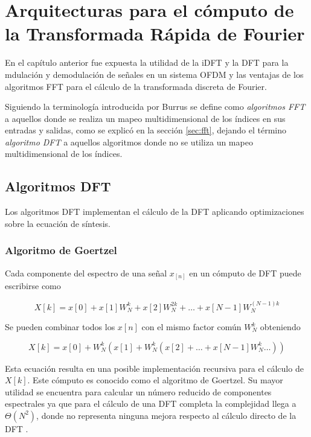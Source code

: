\chapter{Arquitecturas para el cómputo de la Transformada Rápida de Fourier} \label{sec:cap_arqs}

En el capítulo anterior fue expuesta la utilidad de la iDFT y la DFT para la mdulación y
demodulación de señales en un sistema OFDM y las ventajas de los algoritmos FFT para el cálculo de
la transformada discreta de Fourier.

Siguiendo la terminología introducida por Burrus \cite{Burrus} \cite{Meyer3_1} se define como
\textit{algoritmos FFT} a aquellos donde se realiza un mapeo multidimensional de los índices en sus
entradas y salidas, como se explicó en la sección \ref{sec:fft}, dejando el término \textit{algoritmo DFT}
a aquellos algoritmos donde no se utiliza un mapeo multidimensional de los índices.

\section{Algoritmos DFT}

Los algoritmos DFT implementan el cálculo de la DFT aplicando optimizaciones sobre la
ecuación de síntesis.

\subsection{Algoritmo de Goertzel}

Cada componente del espectro de una señal $x_{[n]}$ en un cómputo de DFT puede escribirse como

\begin{equation}
	X[k] = x[0] + x[1]W_{N}^{k} + x[2]W_{N}^{2k} + \ldots + x[N-1]W_{N}^{(N-1)k}  
\label{eq:goertz1}
\end{equation}

Se pueden combinar todos los $x[n]$ con el mismo factor común $W_N^k$ obteniendo

\begin{equation}
	X[k] = x[0] + W_{N}^{k}(x[1] + W_{N}^{k}(x[2] + \ldots + x[N-1]W_{N}^{k} \ldots ))  
\label{eq:goertz2}
\end{equation}

Esta ecuación resulta en una posible implementación recursiva para el cálculo de $X[k]$. Este
cómputo es conocido como el algoritmo de Goertzel. Su mayor utilidad se encuentra para calcular un
número reducido de componentes espectrales ya que para el cálculo de una DFT completa la complejidad
llega a $\Theta(N^2)$, donde no representa ninguna mejora respecto al cálculo directo de la DFT
\cite{meyer_Goerts}.

